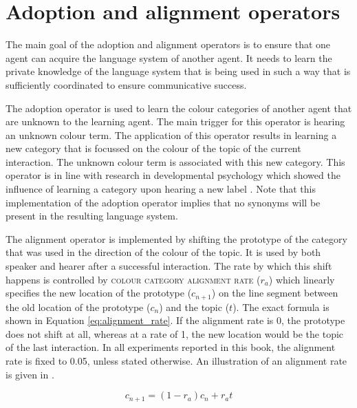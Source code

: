 \section{Adoption and alignment operators}
\label{s:bcs-adoption-alignment-operators}

The main goal of the adoption and alignment operators is to ensure
that one agent can acquire the language system of another agent. It
needs to learn the private knowledge of the language system that is
being used in such a way that is sufficiently coordinated to ensure
communicative success.

The adoption operator
is used to learn the colour categories of
another agent that are unknown to the learning agent. The main trigger
for this operator is hearing an unknown colour term. The application
of this operator results in learning a new category that is focussed
on the colour of the topic of the current interaction. The unknown
colour term is associated with this new category. This operator is in
line with research in developmental psychology which showed the
influence of learning a category upon hearing a new label
\citep{xu02role}. Note that this implementation of the adoption
operator implies that no synonyms will be present in the resulting
language system.

The alignment operator is implemented by shifting the prototype of
the category that was used in the direction of the colour of the
topic. It is used by both speaker and hearer after a successful
interaction. The rate by which this shift happens is controlled by
\textsc{colour category alignment rate} 
($r_a$) which linearly specifies the new
location of the prototype ($c_{n+1}$) on the line segment between the
old location of the prototype ($c_n$) and the topic ($t$). The exact
formula is shown in Equation \ref{eq:alignment_rate}. If the alignment
rate is 0, the prototype does not shift at all, whereas at a rate of
1, the new location would be the topic of the last interaction. In all
experiments reported in this book, the alignment rate is fixed to
0.05, unless stated otherwise. An illustration of an alignment rate is
given in .

\begin{equation}
c_{n+1} = (1 - r_a) c_n  + r_a t
\label{eq:alignment_rate}
\end{equation}

